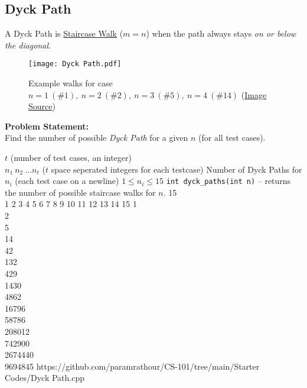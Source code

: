 \subsection{Dyck Path}{\label{pp:dyckpath}}
A Dyck Path is \hyperref[pp:staircasewalk]{Staircase Walk} ($m=n$) when the path always stays \emph{on or below the diagonal}.
\begin{figure}[H]
	\centering
	\texttt{[image: Dyck Path.pdf]}
	\caption{Example walks for case $n=1\ (\#1),\ n=2\ (\#2),\ n=3\ (\#5), \ n=4\ (\#14)$ (\href{https://mathworld.wolfram.com/DyckPath.html}{Image Source})}
	\label{fig:dyckpath}
\end{figure}
\vspace{-1em}
\textbf{Problem Statement:}\\
Find the number of possible \emph{Dyck Path} for a given $n$ (for all test cases).
\begin{testcasesFunction}
	{$t$ \hfill(number of test cases, an integer)\\
	$n_1\ n_2\ \ldots n_t$ \hfill($t$ space seperated integers for each testcase)}
	{Number of Dyck Paths for $n_i$  \hfill(each test case on a newline)}
	{$1 \leq n_i \leq 15$}
	{\texttt{int dyck\_paths(int n)} -- returns the number of possible staircase walks for $n$.}
	{15\\1 2 3 4 5 6 7 8 9 10 11 12 13 14 15}
	{1\\2\\5\\14\\42\\132\\429\\1430\\4862\\16796\\58786\\208012\\742900\\2674440\\9694845}
	{https://github.com/paramrathour/CS-101/tree/main/Starter Codes/Dyck Path.cpp}
\end{testcasesFunction}
